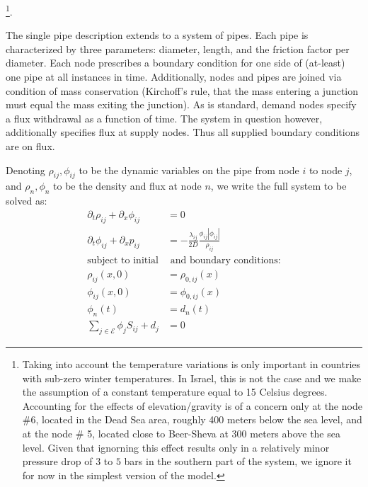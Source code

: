 \footnote{Taking into account the temperature variations is only important in countries with sub-zero winter temperatures. %
In Israel, this is not the case and we make the assumption of a constant temperature equal to 15 Celsius degrees. Accounting for the effects of elevation/gravity is of a concern only at the node \#6, located 
in the Dead Sea area, roughly 400 meters below the sea level, and at the node \# 5, located close to  Beer-Sheva at 300 meters above the sea level. Given that ignorning this effect results only in a relatively minor pressure drop of $3$ to $5$ bars in the southern part of the system, we ignore it for now in the simplest version of the model.}.

The single pipe description extends to a system of pipes. Each pipe is characterized by three parameters: diameter, length, and the friction factor per diameter. Each node prescribes a boundary condition for one side of (at-least) one pipe at all instances in time.
Additionally, nodes and pipes are joined via condition of mass conservation (Kirchoff's rule, that the mass entering a junction must equal the mass exiting the junction).
As is standard, demand nodes specify a flux withdrawal as a function of time. The system in question however, additionally specifies flux at supply nodes. Thus all supplied boundary conditions are on flux.

Denoting $\rho_{ij}, \phi_{ij}$ to be the dynamic variables on the pipe from node $i$ to node $j$, and $\rho_n,\phi_n$ to be the density and flux at node $n$, we write the full system to be solved as:
\begin{align}
    \partial_t \rho_{ij} + \partial_x \phi_{ij} &= 0\\
    \partial_t \phi_{ij} + \partial_x p_{ij} &= -\frac{\lambda_{ij}}{2D}\frac{\phi_{ij}|\phi_{ij}|}{\rho_{ij}}\\
    \text{subject to initial}& \text{ and boundary conditions:} \nonumber\\
    \rho_{ij}(x,0) &= \rho_{0,ij}(x)\\
    \phi_{ij}(x,0) &= \phi_{0,ij}(x)\\
    \phi_n(t) &= d_n(t)\\
    \sum_{j \in \mathcal{E}} \phi_j S_{ij} + d_{j} &= 0
\end{align}

